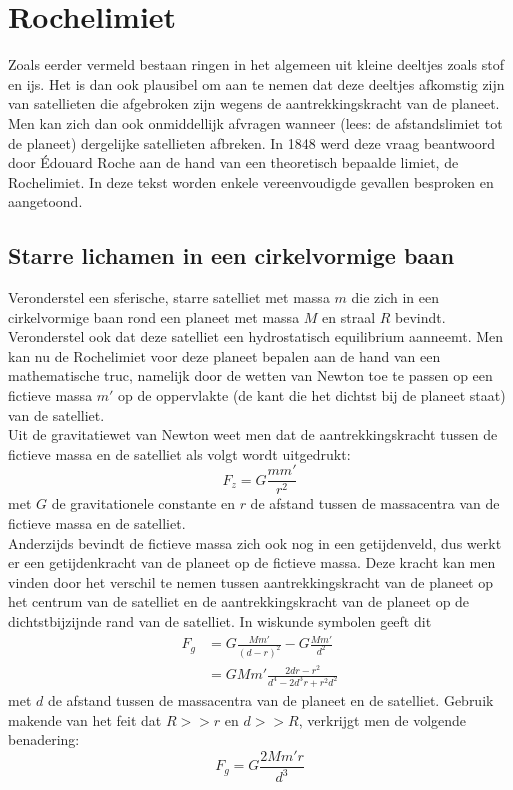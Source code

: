 \documentclass[a4paper]{article}
\begin{document}
	
\section{Rochelimiet}
Zoals eerder vermeld bestaan ringen in het algemeen uit kleine deeltjes zoals stof en ijs. Het is dan ook plausibel om aan te nemen dat deze deeltjes afkomstig zijn van satellieten die afgebroken zijn wegens de aantrekkingskracht van de planeet. Men kan zich dan ook onmiddellijk  afvragen wanneer (lees: de afstandslimiet tot de planeet) dergelijke satellieten afbreken. In 1848 werd deze vraag beantwoord door \'{E}douard Roche aan de hand van een theoretisch bepaalde limiet, de Rochelimiet. In deze tekst worden enkele vereenvoudigde gevallen besproken en aangetoond.

\subsection{Starre lichamen in een cirkelvormige baan}
Veronderstel een sferische, starre satelliet met massa $m$ die zich in een cirkelvormige baan rond een planeet met massa $M$ en straal $R$ bevindt. Veronderstel ook dat deze satelliet een hydrostatisch equilibrium aanneemt. Men kan nu de Rochelimiet voor deze planeet bepalen aan de hand van een mathematische truc, namelijk door de wetten van Newton toe te passen op een fictieve massa $m'$ op de oppervlakte (de kant die het dichtst bij de planeet staat) van de satelliet.\\

\noindent
Uit de gravitatiewet van Newton weet men dat de aantrekkingskracht tussen de fictieve massa en de satelliet als volgt wordt uitgedrukt:
	\begin{equation}
	F_z = G\frac{mm'}{r^2}
	\end{equation}
met $G$ de gravitationele constante en $r$ de afstand tussen de massacentra van de fictieve massa en de satelliet.\\

\noindent
Anderzijds bevindt de fictieve massa zich ook nog in een getijdenveld, dus werkt er een getijdenkracht van de planeet op de fictieve massa. Deze kracht kan men vinden door het verschil te nemen tussen aantrekkingskracht van de planeet op het centrum van de satelliet en de aantrekkingskracht van de planeet op de dichtstbijzijnde rand van de satelliet. In wiskunde symbolen geeft dit
	\begin{align}
	F_g &= G\frac{Mm'}{(d-r)^2} - G\frac{Mm'}{d^2}\\
	&= GMm'\frac{2dr-r^2}{d^4 - 2d^3r +r^2 d^2}
	\end{align}	 
met $d$ de afstand tussen de massacentra van de planeet en de satelliet. Gebruik makende van het feit dat $R>>r$ en $d>>R$, verkrijgt men de volgende benadering:
	\begin{equation}
	F_g = G\frac{2Mm'r}{d^3}
	\end{equation}\\
	
\end{document}
